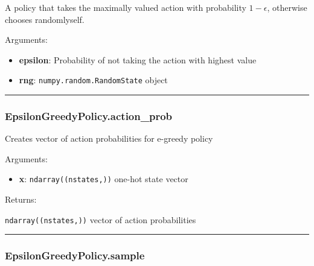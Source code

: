 \begin{Shaded}
\begin{Highlighting}[]
\end{Highlighting}
\end{Shaded}

A policy that takes the maximally valued action with probability
\(1-\epsilon\), otherwise chooses randomlyself.

Arguments:

\begin{itemize}
\tightlist
\item
  \textbf{epsilon}: Probability of not taking the action with highest
  value
\item
  \textbf{rng}: \texttt{numpy.random.RandomState} object
\end{itemize}

\begin{center}\rule{0.5\linewidth}{\linethickness}\end{center}

\hypertarget{epsilongreedypolicy.action_prob}{%
\subsubsection{EpsilonGreedyPolicy.action\_prob}\label{epsilongreedypolicy.action_prob}}

\begin{Shaded}
\begin{Highlighting}[]
\end{Highlighting}
\end{Shaded}

Creates vector of action probabilities for e-greedy policy

Arguments:

\begin{itemize}
\tightlist
\item
  \textbf{x}: \texttt{ndarray((nstates,))} one-hot state vector
\end{itemize}

Returns:

\texttt{ndarray((nstates,))} vector of action probabilities

\begin{center}\rule{0.5\linewidth}{\linethickness}\end{center}

\hypertarget{epsilongreedypolicy.sample}{%
\subsubsection{EpsilonGreedyPolicy.sample}\label{epsilongreedypolicy.sample}}

